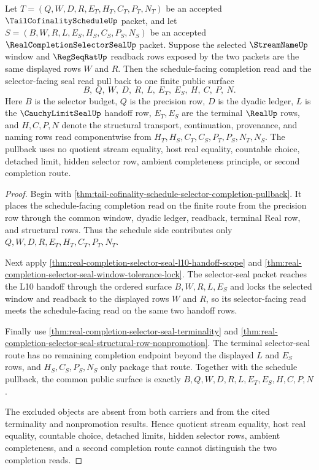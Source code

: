 \begin{theorem}
\label{thm:tail-cofinality-schedule-selector-seal-pullback}
Let $T=(Q,W,D,R,E_T,H_T,C_T,P_T,N_T)$ be an accepted
$\TailCofinalityScheduleUp$ packet, and let
$S=(B,W,R,L,E_S,H_S,C_S,P_S,N_S)$ be an accepted
$\RealCompletionSelectorSealUp$ packet. Suppose the selected
$\StreamNameUp$ window and $\RegSeqRatUp$ readback rows exposed by the two
packets are the same displayed rows $W$ and $R$. Then the
schedule-facing completion read and the selector-facing seal read pull back
to one finite public surface
$$
B,\ Q,\ W,\ D,\ R,\ L,\ E_T,\ E_S,\ H,\ C,\ P,\ N.
$$
Here $B$ is the selector budget, $Q$ is the precision row, $D$ is the dyadic
ledger, $L$ is the $\CauchyLimitSealUp$ handoff row, $E_T,E_S$ are the
terminal $\RealUp$ rows, and $H,C,P,N$ denote the structural transport,
continuation, provenance, and naming rows read componentwise from
$H_T,H_S,C_T,C_S,P_T,P_S,N_T,N_S$. The pullback uses no quotient stream
equality, host real equality, countable choice, detached limit, hidden
selector row, ambient completeness principle, or second completion route.
\end{theorem}
\begin{proof}
Begin with
\autoref{thm:tail-cofinality-schedule-selector-completion-pullback}. It
places the schedule-facing completion read on the finite route from the
precision row through the common window, dyadic ledger, readback, terminal
Real row, and structural rows. Thus the schedule side contributes only
$Q,W,D,R,E_T,H_T,C_T,P_T,N_T$.

Next apply
\autoref{thm:real-completion-selector-seal-l10-handoff-scope} and
\autoref{thm:real-completion-selector-seal-window-tolerance-lock}. The
selector-seal packet reaches the L10 handoff through the ordered surface
$B,W,R,L,E_S$ and locks the selected window and readback to the displayed
rows $W$ and $R$, so its selector-facing read meets the schedule-facing read
on the same two handoff rows.

Finally use
\autoref{thm:real-completion-selector-seal-terminality} and
\autoref{thm:real-completion-selector-seal-structural-row-nonpromotion}. The
terminal selector-seal route has no remaining completion endpoint beyond the
displayed $L$ and $E_S$ rows, and $H_S,C_S,P_S,N_S$ only package that route.
Together with the schedule pullback, the common public surface is exactly
$B,Q,W,D,R,L,E_T,E_S,H,C,P,N$.

The excluded objects are absent from both carriers and from the cited
terminality and nonpromotion results. Hence quotient stream equality, host
real equality, countable choice, detached limits, hidden selector rows,
ambient completeness, and a second completion route cannot distinguish the
two completion reads.
\end{proof}

